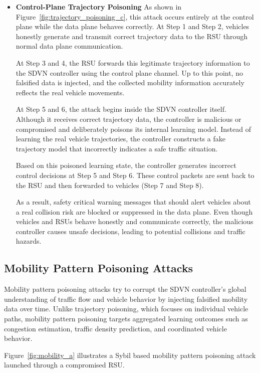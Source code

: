\documentclass[12pt, a4paper]{report}
\begin{document}
\begin{itemize}
	\item \textbf{Control-Plane Trajectory Poisoning}
	As shown in Figure~\ref{fig:trajectory_poisoning_c}, this attack occurs entirely at the control plane while the data plane behaves correctly. At Step 1 and Step 2, vehicles honestly generate and transmit correct trajectory data to the RSU through normal data plane communication.

	At Step 3 and 4, the RSU forwards this legitimate trajectory information to the SDVN controller using the control plane channel. Up to this point, no falsified data is injected, and the collected mobility information accurately reflects the real vehicle movements.

	At Step 5 and 6, the attack begins inside the SDVN controller itself. Although it receives correct trajectory data, the controller is malicious or compromised and deliberately poisons its internal learning model. Instead of learning the real vehicle trajectories, the controller constructs a fake trajectory model that incorrectly indicates a safe traffic situation.

	Based on this poisoned learning state, the controller generates incorrect control decisions at Step 5 and Step 6. These control packets are sent back to the RSU and then forwarded to vehicles (Step 7 and Step 8).

	As a result, safety critical warning messages that should alert vehicles about a real collision risk are blocked or suppressed in the data plane. Even though vehicles and RSUs behave honestly and communicate correctly, the malicious controller causes unsafe decisions, leading to potential collisions and traffic hazards.
\end{itemize}

\subsection{Mobility Pattern Poisoning Attacks}
\label{sec:mobility_pattern_poisoning}

Mobility pattern poisoning attacks try to corrupt the SDVN controller's global understanding of traffic flow and vehicle behavior by injecting falsified mobility data over time. Unlike trajectory poisoning, which focuses on individual vehicle paths, mobility pattern poisoning targets aggregated learning outcomes such as congestion estimation, traffic density prediction, and coordinated vehicle behavior.

Figure~\ref{fig:mobility_a} illustrates a Sybil based mobility pattern poisoning attack launched through a compromised RSU.
\end{document}
